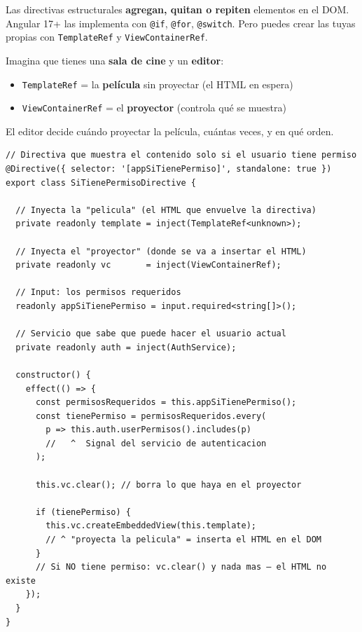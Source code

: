 \documentclass[12pt, a4paper]{article}
\begin{document}
Las directivas estructurales \textbf{agregan, quitan o repiten} elementos en el DOM.
Angular 17+ las implementa con \texttt{@if}, \texttt{@for}, \texttt{@switch}.
Pero puedes crear las tuyas propias con \texttt{TemplateRef} y \texttt{ViewContainerRef}.

\begin{tcolorbox}[analogia, title={\emoji{film-frames} \emoji{scissors} La Sala de Edición}]
  Imagina que tienes una \textbf{sala de cine} y un \textbf{editor}:
  \begin{itemize}
    \item {} \texttt{TemplateRef} = la \textbf{película} sin proyectar (el HTML en espera)
    \item {} \texttt{ViewContainerRef} = el \textbf{proyector} (controla qué se muestra)
  \end{itemize}
  El editor decide cuándo proyectar la película, cuántas veces, y en qué orden.
\end{tcolorbox}

\begin{lstlisting}
// Directiva que muestra el contenido solo si el usuario tiene permiso
@Directive({ selector: '[appSiTienePermiso]', standalone: true })
export class SiTienePermisoDirective {

  // Inyecta la "pelicula" (el HTML que envuelve la directiva)
  private readonly template = inject(TemplateRef<unknown>);

  // Inyecta el "proyector" (donde se va a insertar el HTML)
  private readonly vc       = inject(ViewContainerRef);

  // Input: los permisos requeridos
  readonly appSiTienePermiso = input.required<string[]>();

  // Servicio que sabe que puede hacer el usuario actual
  private readonly auth = inject(AuthService);

  constructor() {
    effect(() => {
      const permisosRequeridos = this.appSiTienePermiso();
      const tienePermiso = permisosRequeridos.every(
        p => this.auth.userPermisos().includes(p)
        //   ^  Signal del servicio de autenticacion
      );

      this.vc.clear(); // borra lo que haya en el proyector

      if (tienePermiso) {
        this.vc.createEmbeddedView(this.template);
        // ^ "proyecta la pelicula" = inserta el HTML en el DOM
      }
      // Si NO tiene permiso: vc.clear() y nada mas — el HTML no existe
    });
  }
}
\end{lstlisting}
\end{document}
